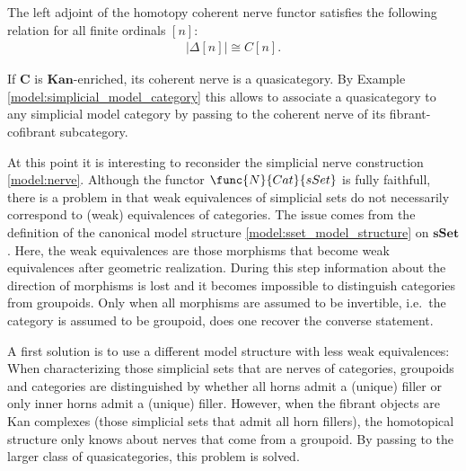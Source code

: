     \begin{property}
        The left adjoint of the homotopy coherent nerve functor satisfies the following relation for all finite ordinals $[n]$:
        \begin{gather}
            |\Delta[n]|\cong C[n].
        \end{gather}
    \end{property}

    \begin{property}[Quasicategories]
        If $\mathbf{C}$ is $\mathbf{Kan}$-enriched, its coherent nerve is a quasicategory. By Example \ref{model:simplicial_model_category} this allows to associate a quasicategory to any simplicial model category by passing to the coherent nerve of its fibrant-cofibrant subcategory.
    \end{property}

    At this point it is interesting to reconsider the simplicial nerve construction \ref{model:nerve}. Although the functor $\func{N}{Cat}{sSet}$ is fully faithfull, there is a problem in that weak equivalences of simplicial sets do not necessarily correspond to (weak) equivalences of categories. The issue comes from the definition of the canonical model structure \ref{model:sset_model_structure} on $\mathbf{sSet}$. Here, the weak equivalences are those morphisms that become weak equivalences after geometric realization. During this step information about the direction of morphisms is lost and it becomes impossible to distinguish categories from groupoids. Only when all morphisms are assumed to be invertible, i.e.~the category is assumed to be groupoid, does one recover the converse statement.

    A first solution is to use a different model structure with less weak equivalences:
    When characterizing those simplicial sets that are nerves of categories, groupoids and categories are distinguished by whether all horns admit a (unique) filler or only inner horns admit a (unique) filler. However, when the fibrant objects are Kan complexes (those simplicial sets that admit all horn fillers), the homotopical structure only knows about nerves that come from a groupoid. By passing to the larger class of quasicategories, this problem is solved.

